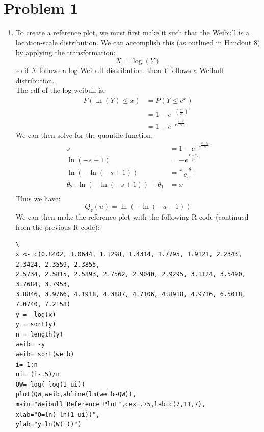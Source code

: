 \documentclass{article}
\title{\thetitle}
\author{\theauthor}
\begin{document}
\maketitle
\section*{Problem 1}
\begin{enumerate}
\item To create a reference plot, we must first make it such that the Weibull is a location-scale distribution. We can accomplish this (as outlined in Handout 8) by applying the transformation: \\
\[
X = \log(Y)
\]
so if $X$ follows a log-Weibull distribution, then $Y$ follows a Weibull distribution. \\
The cdf of the log weibull is: \\
\begin{align*}
P(\ln(Y) \leq x) &= P(Y \leq e^x) \\
&= 1 - e^{-(\frac{e^x}{\alpha})^\gamma} \\
&= 1 - e^{-e^{\frac{x - \theta_1}{\theta_2}}}
\end{align*}
We can then solve for the quantile function: \\
\begin{align*}
s &= 1 - e^{-e^{\frac{x - \theta_1}{\theta_2}}} \\
\ln(-s + 1) &= -e^{\frac{x - \theta_1}{\theta_2}} \\
\ln(-\ln(-s + 1)) &= \frac{x - \theta_1}{\theta_2} \\
\theta_2 \cdot \ln(-\ln(-s + 1)) + \theta_1 &= x \\
\end{align*}
Thus we have: \\
\[
Q_z(u) = \ln(-\ln(-u + 1))
\]
We can then make the reference plot with the following R code (continued from the previous R code):
\begin{verbatim}\
x <- c(0.8402, 1.0644, 1.1298, 1.4314, 1.7795, 1.9121, 2.2343, 2.3424, 2.3559, 2.3855,
2.5734, 2.5815, 2.5893, 2.7562, 2.9040, 2.9295, 3.1124, 3.5490, 3.7684, 3.7953,
3.8846, 3.9766, 4.1918, 4.3887, 4.7106, 4.8918, 4.9716, 6.5018, 7.0740, 7.2158)
y = -log(x)
y = sort(y)
n = length(y)
weib= -y
weib= sort(weib)
i= 1:n
ui= (i-.5)/n
QW= log(-log(1-ui))
plot(QW,weib,abline(lm(weib~QW)),
main="Weibull Reference Plot",cex=.75,lab=c(7,11,7),
xlab="Q=ln(-ln(1-ui))",
ylab="y=ln(W(i))")
\end{verbatim}
\begin{figure}[htbp]

\end{figure}
\end{enumerate}
\end{document}
